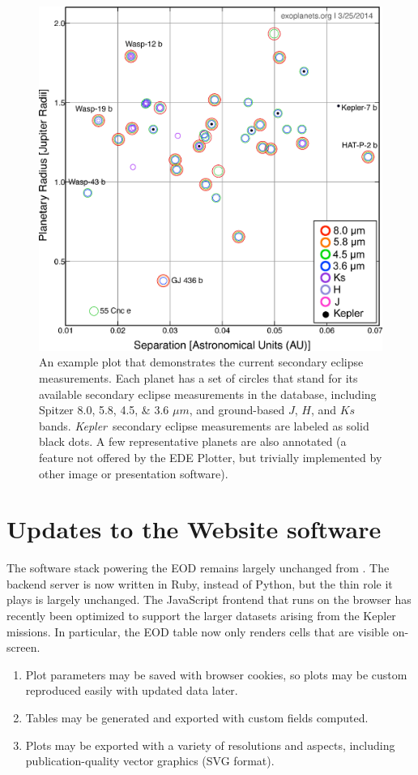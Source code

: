 \documentclass[11pt,preprint]{aastex}
\def\kepler{\textit{Kepler}}
\begin{document}
\begin{CJK*}{UTF8}{gbsn}
\begin{figure}[!htb]
\centering
\includegraphics[width=\textwidth]{fig/senew.eps}
\caption{An example plot that demonstrates the current secondary
  eclipse measurements. Each planet has a set of circles that stand
  for its available secondary eclipse measurements in the database,
  including Spitzer 8.0, 5.8, 4.5, \& 3.6 $\mu m$, and  ground-based
  $J$, $H$, and $Ks$ bands. \kepler\ secondary eclipse measurements
  are labeled as solid black dots. A few representative planets are
  also annotated (a feature not offered by the EDE Plotter, but
  trivially implemented by other image or presentation software).}
\label{fig:se}
\end{figure}


\section{Updates to the Website software}\label{sec:website}

The software stack powering the EOD remains largely unchanged from
\cite{Wright2011}. The backend server is now written in Ruby, instead
of Python, but the thin role it plays is largely unchanged.  The
JavaScript frontend that runs on the browser has recently been
optimized to support the larger datasets arising from the Kepler
missions.  In particular, the EOD table now only renders cells that
are visible on-screen. 
\begin{enumerate}
\item Plot parameters may be saved with browser cookies, so plots may be custom reproduced easily with updated data later.
\item Tables may be generated and exported with custom fields computed.
\item Plots may be exported with a variety of resolutions and aspects, including publication-quality vector graphics (SVG format). 
\end{enumerate}


\end{CJK*}
\end{document}
